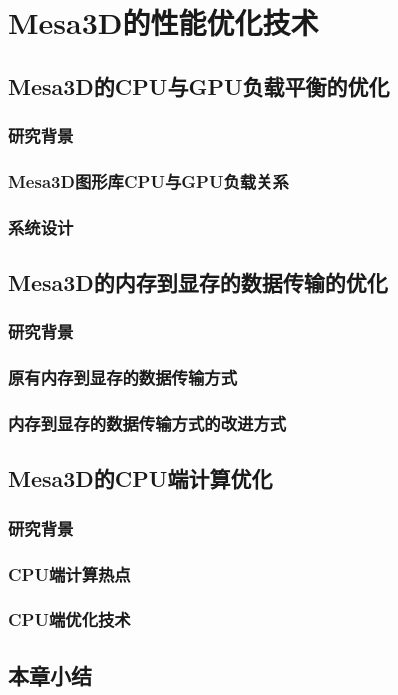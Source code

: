 
\chapter{Mesa3D的性能优化技术}

\section{Mesa3D的CPU与GPU负载平衡的优化}

\subsection{研究背景}

\subsection{Mesa3D图形库CPU与GPU负载关系}

\subsection{系统设计}

\section{Mesa3D的内存到显存的数据传输的优化}

\subsection{研究背景}

\subsection{原有内存到显存的数据传输方式}

\subsection{内存到显存的数据传输方式的改进方式}

\section{Mesa3D的CPU端计算优化}

\subsection{研究背景}

\subsection{CPU端计算热点}

\subsection{CPU端优化技术}

\section{本章小结}
